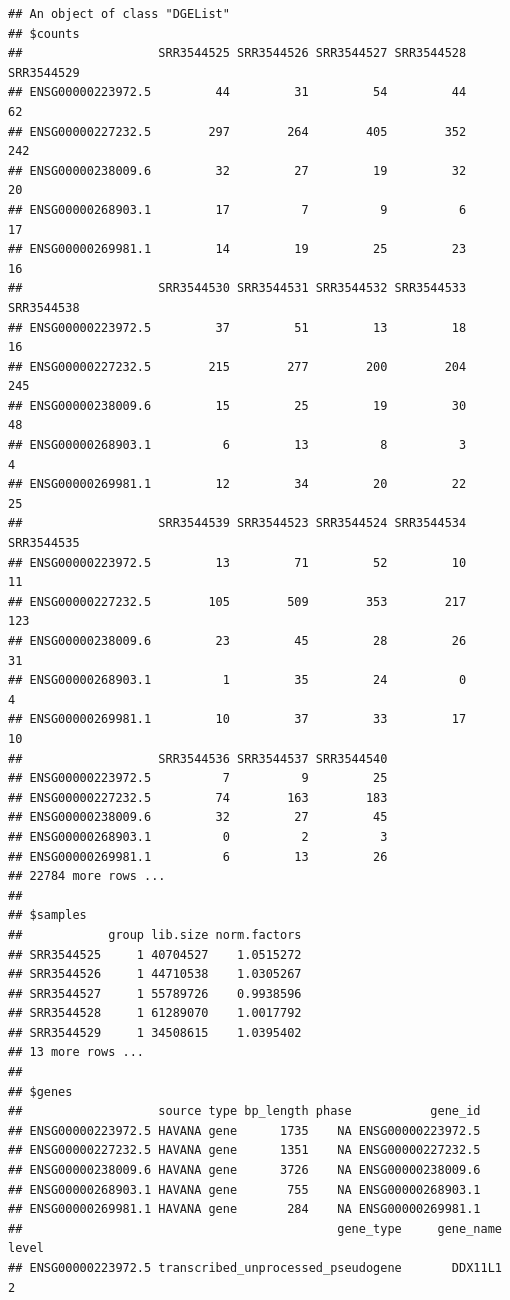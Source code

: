 \documentclass[
]{article}
\begin{document}
\begin{verbatim}
## An object of class "DGEList"
## $counts
##                   SRR3544525 SRR3544526 SRR3544527 SRR3544528 SRR3544529
## ENSG00000223972.5         44         31         54         44         62
## ENSG00000227232.5        297        264        405        352        242
## ENSG00000238009.6         32         27         19         32         20
## ENSG00000268903.1         17          7          9          6         17
## ENSG00000269981.1         14         19         25         23         16
##                   SRR3544530 SRR3544531 SRR3544532 SRR3544533 SRR3544538
## ENSG00000223972.5         37         51         13         18         16
## ENSG00000227232.5        215        277        200        204        245
## ENSG00000238009.6         15         25         19         30         48
## ENSG00000268903.1          6         13          8          3          4
## ENSG00000269981.1         12         34         20         22         25
##                   SRR3544539 SRR3544523 SRR3544524 SRR3544534 SRR3544535
## ENSG00000223972.5         13         71         52         10         11
## ENSG00000227232.5        105        509        353        217        123
## ENSG00000238009.6         23         45         28         26         31
## ENSG00000268903.1          1         35         24          0          4
## ENSG00000269981.1         10         37         33         17         10
##                   SRR3544536 SRR3544537 SRR3544540
## ENSG00000223972.5          7          9         25
## ENSG00000227232.5         74        163        183
## ENSG00000238009.6         32         27         45
## ENSG00000268903.1          0          2          3
## ENSG00000269981.1          6         13         26
## 22784 more rows ...
## 
## $samples
##            group lib.size norm.factors
## SRR3544525     1 40704527    1.0515272
## SRR3544526     1 44710538    1.0305267
## SRR3544527     1 55789726    0.9938596
## SRR3544528     1 61289070    1.0017792
## SRR3544529     1 34508615    1.0395402
## 13 more rows ...
## 
## $genes
##                   source type bp_length phase           gene_id
## ENSG00000223972.5 HAVANA gene      1735    NA ENSG00000223972.5
## ENSG00000227232.5 HAVANA gene      1351    NA ENSG00000227232.5
## ENSG00000238009.6 HAVANA gene      3726    NA ENSG00000238009.6
## ENSG00000268903.1 HAVANA gene       755    NA ENSG00000268903.1
## ENSG00000269981.1 HAVANA gene       284    NA ENSG00000269981.1
##                                            gene_type     gene_name level
## ENSG00000223972.5 transcribed_unprocessed_pseudogene       DDX11L1     2

\end{verbatim}
\end{document}
